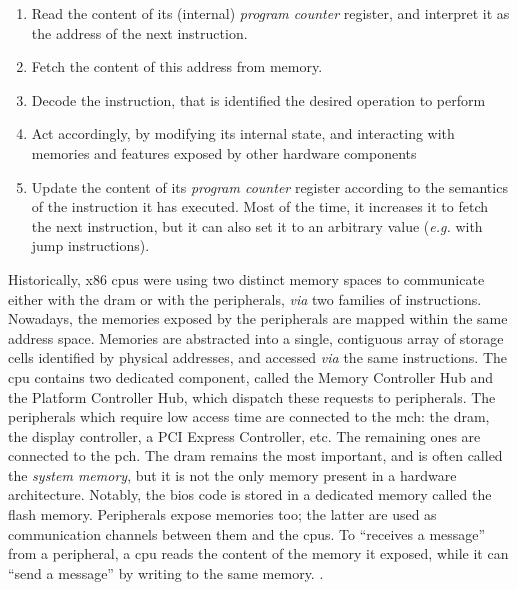 \begin{enumerate}
\item Read the content of its (internal) \emph{program counter} register, and
  interpret it as the address of the next instruction.
%
\item Fetch the content of this address from memory.
%
\item Decode the instruction, that is identified the desired operation to
  perform
%
\item Act accordingly, by modifying its internal state, and interacting with
  memories and features exposed by other hardware components
%
\item Update the content of its \emph{program counter} register according to the
  semantics of the instruction it has executed. Most of the time, it increases
  it to fetch the next instruction, but it can also set it to an arbitrary value
  (\emph{e.g.} with jump instructions).
\end{enumerate}

Historically, x86 \acp{cpu} were using two distinct memory spaces to communicate
either with the \ac{dram} or with the peripherals, \emph{via} two families of
instructions. 
%
Nowadays, the memories exposed by the peripherals are mapped within the same
address space.
%
Memories are abstracted into a single, contiguous array of storage cells
identified by physical addresses, and accessed \emph{via} the same instructions.
%
The \ac{cpu} contains two dedicated component, called the Memory Controller Hub
and the Platform Controller Hub, which dispatch these requests to peripherals. 
%
The peripherals which require low access time are connected to the \ac{mch}: the
\ac{dram}, the display controller, a PCI Express Controller, etc.
%
The remaining ones are connected to the \ac{pch}.
%
The \ac{dram} remains the most important, and is often called the \emph{system
  memory}, but it is not the only memory present in a hardware architecture.
%
Notably, the \ac{bios} code is stored in a dedicated memory called the flash
memory.
%
Peripherals expose memories too; the latter are used as communication channels
between them and the \acp{cpu}.
%
To ``receives a message'' from a peripheral, a \ac{cpu} reads the content of the
memory it exposed, while it can ``send a message'' by writing to the same
memory.
%
.

